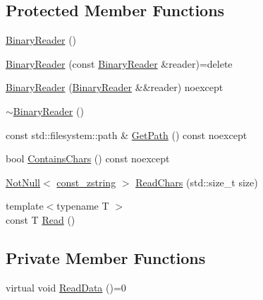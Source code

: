\subsection*{Protected Member Functions}
\begin{DoxyCompactItemize}
\item 
\mbox{\hyperlink{classmage_1_1_binary_reader_aab82579cef4f2f022273cf1adfcc8497}{Binary\+Reader}} ()
\item 
\mbox{\hyperlink{classmage_1_1_binary_reader_a8c1ff948f1d056439f3d8cc37d7f507c}{Binary\+Reader}} (const \mbox{\hyperlink{classmage_1_1_binary_reader}{Binary\+Reader}} \&reader)=delete
\item 
\mbox{\hyperlink{classmage_1_1_binary_reader_a520841747b74b4b0e95f8d9b595492fa}{Binary\+Reader}} (\mbox{\hyperlink{classmage_1_1_binary_reader}{Binary\+Reader}} \&\&reader) noexcept
\item 
\mbox{\hyperlink{classmage_1_1_binary_reader_a42e6c31bc53f5214675f845756b5a404}{$\sim$\+Binary\+Reader}} ()
\item 
const std\+::filesystem\+::path \& \mbox{\hyperlink{classmage_1_1_binary_reader_af2c3f4e6a98472a6435dd9d1105b4bc9}{Get\+Path}} () const noexcept
\item 
bool \mbox{\hyperlink{classmage_1_1_binary_reader_af68b85b30fbe8b5f2d4720163a658ab5}{Contains\+Chars}} () const noexcept
\item 
\mbox{\hyperlink{namespacemage_a8769f9d670d6b585ea306cb1062af94b}{Not\+Null}}$<$ \mbox{\hyperlink{namespacemage_abfd9206dc607ceb5d13ec68bf075a5c0}{const\+\_\+zstring}} $>$ \mbox{\hyperlink{classmage_1_1_binary_reader_a10d3b5300d4a492dd81638faf463dc11}{Read\+Chars}} (std\+::size\+\_\+t size)
\item 
{\footnotesize template$<$typename T $>$ }\\const T \mbox{\hyperlink{classmage_1_1_binary_reader_aa99b02137069566c010692093b328a6a}{Read}} ()
\end{DoxyCompactItemize}
\subsection*{Private Member Functions}
\begin{DoxyCompactItemize}
\item 
virtual void \mbox{\hyperlink{classmage_1_1_binary_reader_a67157828a9781644fb55bd7f3558f07c}{Read\+Data}} ()=0
\end{DoxyCompactItemize}
